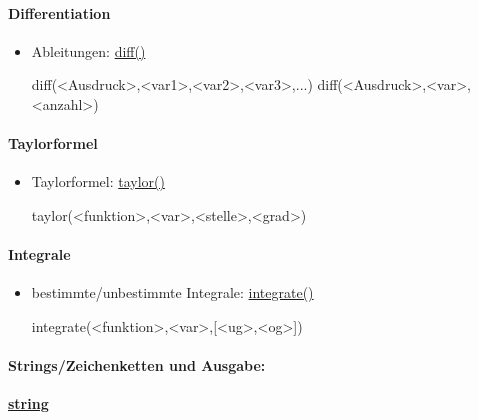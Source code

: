 \documentclass[a4paper,9pt,DIV15,twocolumn]{scrartcl}
\begin{document}
{\paragraph{Differentiation}
\begin{itemize}
 \item Ableitungen: \href{https://sage.math.uni-goettingen.de/doc/static/reference/sage/calculus/functional.html?highlight=diff#sage.calculus.functional.diff}{diff()}
\begin{sageinsmall}
diff(<Ausdruck>,<var1>,<var2>,<var3>,...)
diff(<Ausdruck>,<var>,<anzahl>) 
\end{sageinsmall}
\end{itemize}

\paragraph{Taylorformel}
\begin{itemize}
 \item Taylorformel: \href{https://sage.math.uni-goettingen.de/doc/static/reference/sage/calculus/functional.html?highlight=diff#sage.calculus.functional.integral}{taylor()}

\begin{sageinsmall}
taylor(<funktion>,<var>,<stelle>,<grad>)
\end{sageinsmall}
\end{itemize}

\paragraph{Integrale}
\begin{itemize}
\item bestimmte/unbestimmte Integrale: \href{https://sage.math.uni-goettingen.de/doc/static/reference/sage/calculus/functional.html?highlight=diff#sage.calculus.functional.integral}{integrate()}
\begin{sageinsmall}
integrate(<funktion>,<var>,[<ug>,<og>]) 
\end{sageinsmall}
\end{itemize}

\paragraph{Strings/Zeichenketten und Ausgabe:}\href{http://docs.python.org/library/string.html?highlight=string.replace#string-constants}{\textbf{string}}

}
\end{document}

